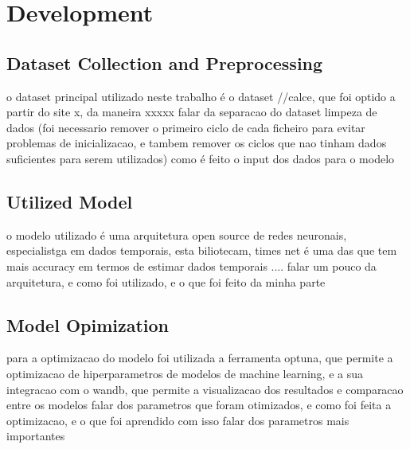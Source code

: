 \chapter{Development}
\label{ch:Development}
\lipsum[1]
\section{Dataset Collection and Preprocessing}

o dataset principal utilizado neste trabalho é o dataset //calce, que foi optido a partir do site x, da maneira xxxxx
falar da separacao do dataset
limpeza de dados (foi necessario remover o primeiro ciclo de cada ficheiro para  evitar problemas de inicializacao, e tambem remover os ciclos que nao tinham dados suficientes para serem utilizados)
como é feito o input dos dados para o modelo





\section{Utilized Model}
o modelo utilizado é uma arquitetura open source de redes neuronais, especialistga em dados temporais, esta biliotecam, times net é uma das que tem mais accuracy em termos de estimar dados temporais
.... falar um pouco da arquitetura, e como foi utilizado, e o que foi feito da minha parte

\section{Model Opimization}
para a optimizacao do modelo foi utilizada a ferramenta optuna, que permite a optimizacao de hiperparametros de modelos de machine learning, e a sua integracao com o wandb, que permite a visualizacao dos resultados e comparacao entre os modelos
falar dos parametros que foram otimizados, e como foi feita a optimizacao, e o que foi aprendido com isso
falar dos parametros mais importantes
